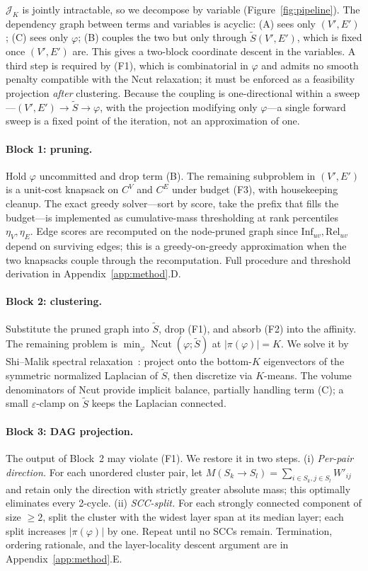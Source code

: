 \documentclass[table, 11pt]{article}
\DeclareMathOperator{\Ncut}{Ncut}
\begin{document}
$\mathcal{J}_K$ is jointly intractable, so we decompose by
variable (Figure~\ref{fig:pipeline}). The dependency graph between
terms and variables is acyclic: (A) sees only $(V', E')$; (C) sees
only $\varphi$; (B) couples the two but only through $\tilde S(V',
E')$, which is fixed once $(V', E')$ are. This gives a two-block
coordinate descent in the variables. A third step is required by
(F1), which is combinatorial in $\varphi$ and admits no smooth
penalty compatible with the Ncut relaxation; it must be enforced as
a feasibility projection \emph{after} clustering. Because the
coupling is one-directional within a sweep---$(V', E') \to \tilde S
\to \varphi$, with the projection modifying only $\varphi$---a
single forward sweep is a fixed point of the iteration, not an
approximation of one.

\paragraph{Block 1: pruning.}
Hold $\varphi$ uncommitted and drop term (B). The remaining
subproblem in $(V', E')$ is a unit-cost knapsack on $C^V$ and $C^E$
under budget (F3), with housekeeping cleanup. The exact greedy
solver---sort by score, take the prefix that fills the budget---is
implemented as cumulative-mass thresholding at rank percentiles
$\eta_V, \eta_E$. Edge scores are recomputed on the node-pruned
graph since $\text{Inf}_{uv}, \text{Rel}_{uv}$ depend on surviving
edges; this is a greedy-on-greedy approximation when the two
knapsacks couple through the recomputation. Full procedure and
threshold derivation in Appendix~\ref{app:method}.D.

\paragraph{Block 2: clustering.}
Substitute the pruned graph into $\tilde S$, drop (F1), and absorb
(F2) into the affinity. The remaining problem is
$\min_\varphi \Ncut(\varphi; \tilde S)$ at $|\pi(\varphi)| = K$.
We solve it by Shi--Malik spectral
relaxation~\cite{shi2000normalized, von2007tutorial}: project onto
the bottom-$K$ eigenvectors of the symmetric normalized Laplacian
of $\tilde S$, then discretize via $K$-means. The volume
denominators of Ncut provide implicit balance, partially handling
term (C); a small $\varepsilon$-clamp on $\tilde S$ keeps the
Laplacian connected.

\paragraph{Block 3: DAG projection.}
The output of Block~2 may violate (F1). We restore it in two steps.
(i) \emph{Per-pair direction.} For each unordered cluster pair, let
$M(S_k \!\to\! S_l) = \sum_{i \in S_k, j \in S_l} W'_{ij}$ and
retain only the direction with strictly greater absolute mass; this
optimally eliminates every 2-cycle. (ii) \emph{SCC-split.} For each
strongly connected component of size $\ge 2$, split the cluster
with the widest layer span at its median layer; each split
increases $|\pi(\varphi)|$ by one. Repeat until no SCCs remain.
Termination, ordering rationale, and the layer-locality descent
argument are in Appendix~\ref{app:method}.E.
\end{document}
